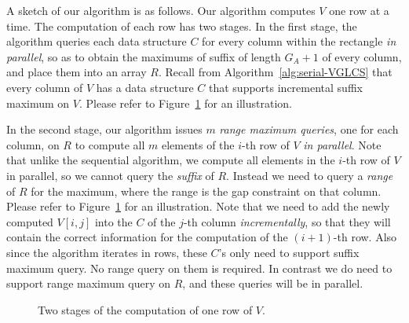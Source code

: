 


A sketch of our algorithm is as follows.  Our algorithm computes $V$ one
row at a time.  The computation of each row has two stages.  In the
first stage, the algorithm queries each data structure $C$ for every
column within the rectangle {\em in parallel}, so as to obtain the
maximums of suffix of length $G_A + 1$ of every column, and place them
into an array $R$. Recall from Algorithm~\ref{alg:serial-VGLCS} that
every column of $V$ has a data structure $C$ that supports incremental
suffix maximum on $V$.  Please refer to
Figure~\ref{fig:fig-VGLCS-dp-rmq} for an illustration.

In the second stage, our algorithm issues $m$ {\em range maximum
queries}, one for each column, on $R$ to compute all $m$ elements of the
$i$-th row of $V$ {\em in parallel}.  Note that unlike the sequential
algorithm, we compute all elements in the $i$-th row of $V$ in parallel,
so we cannot query the {\em suffix} of $R$.  Instead we need to query a
{\em range} of $R$ for the maximum, where the range is the gap
constraint on that column.  Please refer to
Figure~\ref{fig:fig-VGLCS-dp-rmq} for an illustration.  Note that we
need to add the newly computed $V[i, j]$ into the $C$ of the $j$-th
column {\em incrementally}, so that they will contain the correct
information for the computation of the $(i+1)$-th row.  Also since the
algorithm iterates in rows, these $C$'s only need to support suffix
maximum query.  No range query on them is required.  In contrast we do
need to support range maximum query on $R$, and these queries will be in
parallel.

\begin{figure}
  \centering {} 
  \caption{Two stages of the computation of one row of $V$.}
  \label{fig:fig-VGLCS-dp-rmq}
\end{figure}

